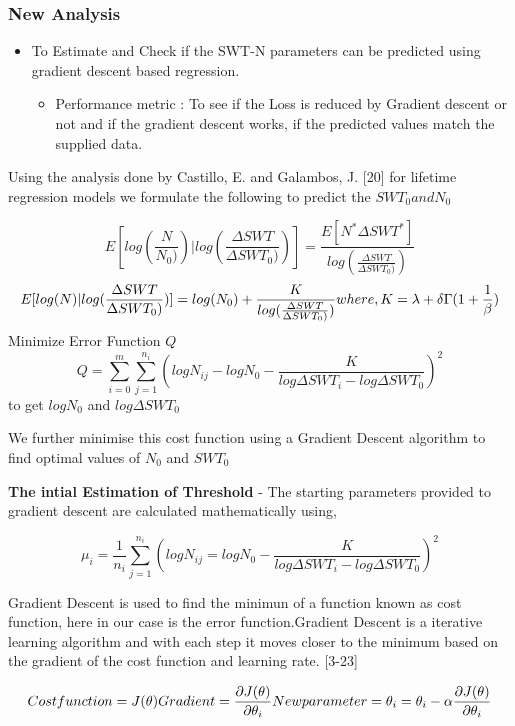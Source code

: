 \documentclass[11pt]{article}
\providecommand{\tightlist}{%
      \setlength{\itemsep}{0pt}\setlength{\parskip}{0pt}}
\begin{document}
\hypertarget{new-analysis}{%
\subsubsection{New Analysis}\label{new-analysis}}

\begin{itemize}
\tightlist
\item
  To Estimate and Check if the SWT-N parameters can be predicted using
  gradient descent based regression.

  \begin{itemize}
  \tightlist
  \item
    Performance metric : To see if the Loss is reduced by Gradient
    descent or not and if the gradient descent works, if the predicted
    values match the supplied data.
  \end{itemize}
\end{itemize}

Using the analysis done by Castillo, E. and Galambos, J. {[}20{]} for
lifetime regression models we formulate the following to predict the
\(SWT_0 and N_0\)

\[
E[log(\frac{N}{N_0)}) | log(\frac{\Delta SWT}{\Delta SWT_0)})] = \frac{E[N^*\Delta SWT^*]}{log(\frac{\Delta SWT}{\Delta SWT_0)})}
\] \[
E[log(N) | log(\frac{\Delta SWT}{\Delta SWT_0)})] = log(N_0) + \frac{K}{log(\frac{\Delta SWT}{\Delta SWT_0)})} \\
where, K = \lambda + \delta\Gamma(1+\frac{1}{\beta})
\] Minimize Error Function \(Q\) \[
Q = \sum_{i=0}^m\sum_{j=1}^{n_i}(logN_{ij} - logN_0 - \frac{K}{log\Delta SWT_i - log\Delta SWT_0})^2
\] to get \(logN_0\) and \(log\Delta SWT_0\)

We further minimise this cost function using a Gradient Descent
algorithm to find optimal values of \(N_0\) and \(SWT_0\)

\textbf{The intial Estimation of Threshold} - The starting parameters
provided to gradient descent are calculated mathematically using,

\[
\mu_i = \frac{1}{n_i}\sum_{j=1}^{n_i}(logN_{ij} = logN_0 - \frac{K}{log\Delta SWT_i - log\Delta SWT_0})^2
\]

Gradient Descent is used to find the minimun of a function known as cost
function, here in our case is the error function.Gradient Descent is a
iterative learning algorithm and with each step it moves closer to the
minimum based on the gradient of the cost function and learning rate.
{[}3-23{]}

\[
Cost function = J(\theta) \\
Gradient = \frac{\partial J(\theta)}{\partial \theta_i} \\
New  parameter = \theta_i = \theta_i - \alpha \frac{\partial J(\theta)}{\partial \theta_i} \\
\]
\end{document}
